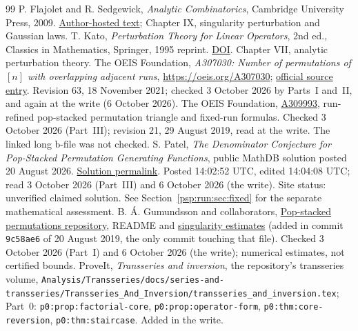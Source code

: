 \documentclass[11pt,letterpaper]{article}
\numberwithin{equation}{section}
\theoremstyle{remark}\newtheorem{remark}[theorem]{Remark}
\newcommand{\file}[1]{\nolinkurl{#1}}
\begin{document}
\begin{thebibliography}{99}
P. Flajolet and R. Sedgewick, \emph{Analytic Combinatorics},
Cambridge University Press, 2009.
\href{https://algo.inria.fr/flajolet/Publications/book.pdf}{Author-hosted text};
Chapter IX, singularity perturbation and Gaussian laws.
T. Kato, \emph{Perturbation Theory for Linear Operators}, 2nd ed.,
Classics in Mathematics, Springer, 1995 reprint.
\href{https://doi.org/10.1007/978-3-642-66282-9}{DOI}.
Chapter VII, analytic perturbation theory.
The OEIS Foundation, \emph{A307030: Number of permutations of $[n]$ with overlapping adjacent runs},
\href{https://oeis.org/A307030}{https://oeis.org/A307030};
\href{https://github.com/oeis/oeisdata/blob/main/seq/A307/A307030.seq}{official source entry}.
Revision 63, 18 November 2021; checked 3 October 2026 by Parts~I and~II, and again at the write (6 October 2026).
The OEIS Foundation, \href{https://oeis.org/A309993}{A309993},
run-refined pop-stacked permutation triangle and fixed-run formulas.
Checked 3 October 2026 (Part~III); revision 21, 29 August 2019, read at the write. The linked long b-file was not checked.
S. Patel, \emph{The Denominator Conjecture for Pop-Stacked Permutation
Generating Functions}, public MathDB solution posted 20 August 2026.
\href{https://mathdb.com/p/381485/the-denominator-conjecture-for-pop-stacked-permutation-gener\#s1}{Solution permalink}.
Posted 14:02:52 UTC, edited 14:04:08 UTC; read 3 October 2026 (Part~III) and 6 October 2026 (the write).
Site status: unverified claimed solution. See Section~\ref{psp:run:sec:fixed}
for the separate mathematical assessment.
B. \'A. Gu\dh mundsson and collaborators,
\href{https://github.com/SuprDewd/pop-stacked-perms}{Pop-stacked permutations repository},
README and
\href{https://github.com/SuprDewd/pop-stacked-perms/blob/master/singularity_estimates.txt}{singularity estimates}
(added in commit \texttt{9c58ae6} of 20 August 2019, the only commit touching that file).
Checked 3 October 2026 (Part~I) and 6 October 2026 (the write); numerical estimates, not certified bounds.
ProveIt, \emph{Transseries and inversion}, the repository's transseries volume,
\file{Analysis/Transseries/docs/series-and-transseries/Transseries_And_Inversion/transseries_and_inversion.tex};
Part~0: \file{p0:prop:factorial-core}, \file{p0:prop:operator-form}, \file{p0:thm:core-reversion}, \file{p0:thm:staircase}. Added in the write.
\end{thebibliography}
\end{document}
